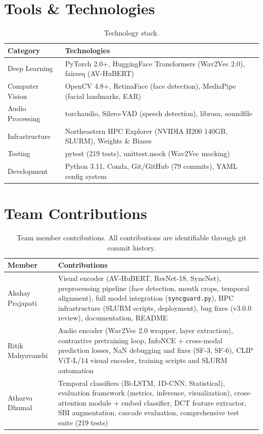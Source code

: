 \documentclass[12pt, letterpaper]{article}
\begin{document}
\section{Tools \& Technologies}

\renewcommand{\arraystretch}{1.5}
\begin{table}[H]
\centering
\begin{tabularx}{\textwidth}{@{} p{3cm} X @{}}
\toprule
\textbf{Category} & \textbf{Technologies} \\
\midrule
Deep Learning & PyTorch 2.0+, HuggingFace Transformers (Wav2Vec 2.0), fairseq (AV-HuBERT) \\
Computer Vision & OpenCV 4.8+, RetinaFace (face detection), MediaPipe (facial landmarks, EAR) \\
Audio Processing & torchaudio, Silero-VAD (speech detection), librosa, soundfile \\
Infrastructure & Northeastern HPC Explorer (NVIDIA H200 140GB, SLURM), Weights \& Biases \\
Testing & pytest (219 tests), unittest.mock (Wav2Vec mocking) \\
Development & Python 3.11, Conda, Git/GitHub (79 commits), YAML config system \\
\bottomrule
\end{tabularx}
\caption{Technology stack.}
\end{table}
\renewcommand{\arraystretch}{1.0}

\section{Team Contributions}

\renewcommand{\arraystretch}{1.5}
\begin{table}[H]
\centering
\begin{tabularx}{\textwidth}{@{} p{3.5cm} X @{}}
\toprule
\textbf{Member} & \textbf{Contributions} \\
\midrule
Akshay Prajapati & Visual encoder (AV-HuBERT, ResNet-18, SyncNet), preprocessing pipeline (face detection, mouth crops, temporal alignment), full model integration (\texttt{syncguard.py}), HPC infrastructure (SLURM scripts, deployment), bug fixes (v3.0.0 review), documentation, README \\
Ritik Mahyavanshi & Audio encoder (Wav2Vec 2.0 wrapper, layer extraction), contrastive pretraining loop, InfoNCE + cross-modal prediction losses, NaN debugging and fixes (SF-3, SF-6), CLIP ViT-L/14 visual encoder, training scripts and SLURM automation \\
Atharva Dhumal & Temporal classifiers (Bi-LSTM, 1D-CNN, Statistical), evaluation framework (metrics, inference, visualization), cross-attention module + embed classifier, DCT feature extractor, SBI augmentation, cascade evaluation, comprehensive test suite (219 tests) \\
\bottomrule
\end{tabularx}
\caption{Team member contributions. All contributions are identifiable through git commit history.}
\end{table}
\renewcommand{\arraystretch}{1.0}
\end{document}
